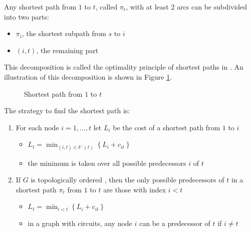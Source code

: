 \documentclass[english]{article}
\begin{document}
Any shortest path from \(1\) to \(t\), called \(\pi_t\), with at least \(2\) arcs can be subdivided into two parts:

\begin{itemize}
  \item \(\pi_i\), the shortest subpath from \(s\) to \(i\)
  \item \(\left( i, t \right)\), the remaining part
\end{itemize}

This decomposition is called the optimality principle of shortest paths in \DAGs.
An illustration of this decomposition is shown in Figure \ref{fig:shortest-path-in-DAG}.

\begin{figure}[htbp]
  \centering
  \bigskip
  \caption{Shortest path from \(1\) to \(t\)}
  \label{fig:shortest-path-in-DAG}
  \bigskip
\end{figure}

\bigskip
The strategy to find the shortest path is:

\begin{enumerate}
  \item For each node \(i = 1, \ldots, t\) let \(L_i\) be the cost of a shortest path from \(1\) to \(i\)
        \begin{itemize}[label=\(\rightarrow\)]
          \item \(L_t = \displaystyle \min_{(i, t) \in \delta^-(t)} \left\{ L_i + c_{it} \right\}\)
          \item the minimum is taken over all possible predecessors \(i\) of \(t\)
        \end{itemize}
  \item If \(G\) is topologically ordered \DAG, then the only possible predecessors of \(t\) in a shortest path \(\pi_t\) from \(1\) to \(t\) are those with index \(i < t\)
        \begin{itemize}[label=\(\rightarrow\)]
          \item \(L_t = \displaystyle \min_{i < t} \left\{ L_i + c_{it} \right\}\)
          \item in a graph with circuits, any node \(i\) can be a predecessor of \(t\) if \(i \neq t\)
        \end{itemize}
\end{enumerate}
\end{document}
